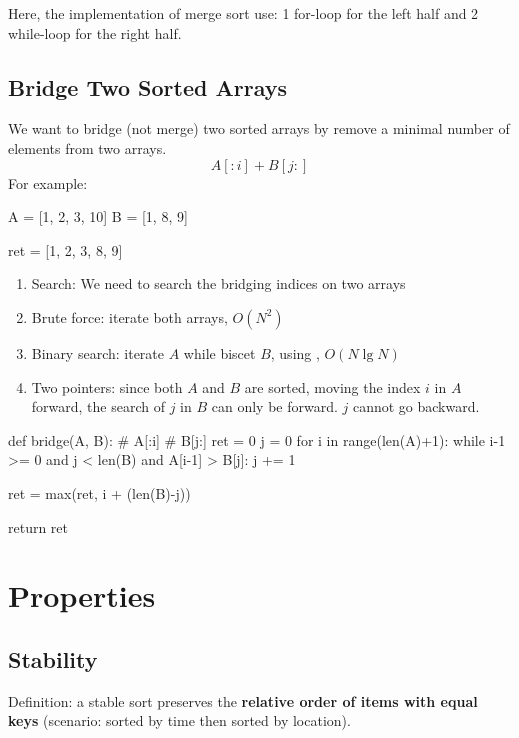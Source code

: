 Here, the implementation of merge sort use: 1 for-loop for the left half and 2 while-loop for the right half.

\subsection{Bridge Two Sorted Arrays}
We want to bridge (not merge) two sorted arrays by remove a minimal number of elements from two arrays. 
$$
A[:i] + B[j:]
$$
For example:
\begin{python}
A = [1, 2, 3, 10]
B = [1, 8, 9]

ret = [1, 2, 3, 8, 9]
\end{python}
\begin{enumerate}
\item Search: We need to search the bridging indices on two arrays 
\item Brute force: iterate both arrays, $O(N^2)$
\item Binary search: iterate $A$ while biscet $B$, using , $O(N \lg{N})$
\item Two pointers: since both $A$ and $B$ are sorted, moving the index $i$ in $A$ forward, the search of $j$ in $B$ can only be forward. $j$ cannot go backward. 
\end{enumerate}

\begin{python}
def bridge(A, B):
    # A[:i]
    # B[j:]
    ret = 0
    j = 0  
    for i in range(len(A)+1):
        while i-1 >= 0 and j < len(B) and A[i-1] > B[j]:
            j += 1

        ret = max(ret, i + (len(B)-j))

    return ret
\end{python}

\section{Properties}
\subsection{Stability}
Definition: a stable sort preserves the \textbf{relative order of items with equal keys} (scenario: sorted by time then sorted by location). 

